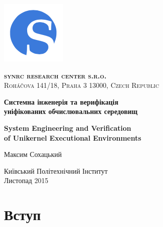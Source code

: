 \documentclass[11pt,oneside]{article}
\begin{document}
\thispagestyle{empty}
\begin{center}

\begin{minipage}[t]{2cm}
    \includegraphics[scale=0.4]{img/S}
\end{minipage}
\begin{minipage}[t]{12cm}
    \begin{flushright}
        \textsc{{\Large {\bf {\color{Blue}syn}{\color{OrangeRed}rc} research center s.r.o.}}}\\
        \textsc{Roháčova 141/18, Praha 3 13000, Czech Republic}\\
    \end{flushright}
\end{minipage}

\vspace{3cm}

    \vspace{3cm}   {\Large \bf Системна інженерія та верифікація\\ \vspace{0.2cm} уніфікованих обчислювальних середовищ}\par
    \vspace{1cm}   {\Large \bf System Engineering and Verification\\ \vspace{0.2cm} of Unikernel Executional Environments}\par
    \vspace{3cm}   {\Large Максим Сохацький\par}
    \vspace{4cm}   {\Large Київський Політехнічний Інститут\\}
    \vspace{0.3cm} {\Large Листопад 2015}

\end{center}

\vspace{2cm}
\newpage
\section{Вступ}

\vspace{1cm}
\end{document}
